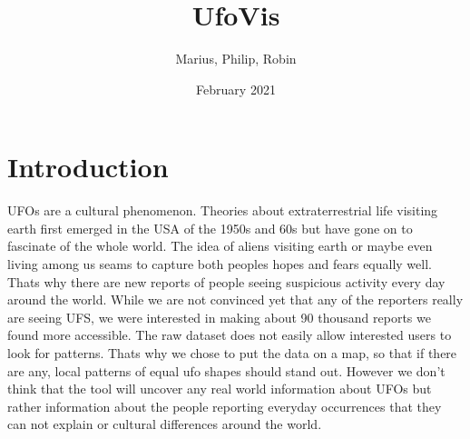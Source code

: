 \documentclass{article}
\title{UfoVis}
\author{Marius, Philip, Robin}
\date{February 2021}
\begin{document}
\maketitle


\section*{Introduction}
UFOs are a cultural phenomenon. Theories about extraterrestrial life visiting earth first emerged in the USA of the 1950s and 60s but have gone on to fascinate of the whole world. The idea of aliens visiting earth or maybe even living among us seams to capture both peoples hopes and fears equally well. Thats why there are new reports of people seeing suspicious activity every day around the world. While we are not convinced yet that any of the reporters really are seeing UFS, we were interested in making about 90 thousand reports we found more accessible. The raw dataset does not easily allow interested users to look for patterns. Thats why we chose to put the data on a map, so that if there are any, local patterns of equal ufo shapes should stand out. However we don't think that the tool will uncover any real world information about UFOs but rather information about the people reporting everyday occurrences that they can not explain or cultural differences around the world.
\end{document}
